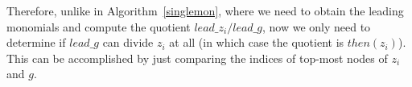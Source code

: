 


Therefore, unlike in Algorithm~\ref{singlemon}, where we need to
obtain the leading monomials and compute the quotient
$lead\_z_i/lead\_g$, now we only need to determine if
$lead\_g$ can divide $z_i$ at all (in which case the quotient is
$then(z_i)$). This can be accomplished by just comparing the indices
of top-most nodes of $z_i$ and $g$. 

